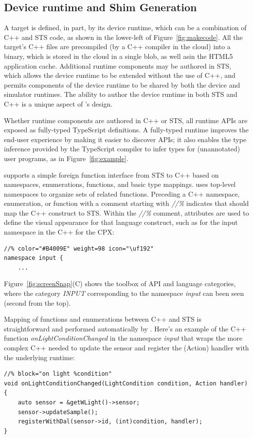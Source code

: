 \subsection{Device runtime and Shim Generation}

A \MC target is defined, in part, by its device runtime, which can be a combination of C++
and STS code, as shown in the lower-left of Figure~\ref{fig:makecode}.
All the target's C++ files are precompiled (by a C++ compiler in the cloud)
into a binary, which is stored in the cloud in a single blob, as well asin the HTML5 application cache. Additional runtime
components may be authored in STS, which allows the device runtime to be extended without the
use of C++, and permits components of the device runtime to be shared by both the device
and simulator runtimes. The ability to author the device runtime in both STS and C++ is
a unique aspect of \MCN's design.

Whether runtime components are authored in C++ or STS, all runtime APIs are exposed as fully-typed
TypeScript definitions. A fully-typed runtime improves the end-user experience
by making it easier to discover APIs; it also enables the type inference provided by the TypeScript
compiler to infer types for (unannotated) user programs, as in Figure~\ref{fig:example}.

\MC supports a simple foreign function interface from STS to C++ based on namespaces,
enumerations, functions, and basic type mappings. \MC uses top-level namespaces to organize sets of related functions.  Preceding a C++ namespace, enumeration, or function
with a comment starting with \emph{//\%} indicates that \MC should map the C++ construct to STS.
Within the \emph{//\%} comment, attributes are used to define the visual appearance for that
language construct, such as for the input namespace in the C++ for the CPX:
\begin{lstlisting}
//% color="#B4009E" weight=98 icon="\uf192"
namespace input {
    ...
\end{lstlisting}

Figure~\ref{fig:screenSnap}(C) shows the toolbox of API and language categories, where the
category \emph{INPUT} corresponding to the namespace \emph{input} can been seen (second
from the top).

Mapping of functions and enumerations between C++ and STS is straightforward
and performed automatically by \MC.
Here's an example of the C++ function \emph{onLightConditionChanged}
in the namespace \emph{input} that
wraps the more complex C++ needed to update the sensor and register the (Action)
handler with the underlying \CO runtime:
\begin{lstlisting}
//% block="on light %condition"
void onLightConditionChanged(LightCondition condition, Action handler) {
    auto sensor = &getWLight()->sensor;
    sensor->updateSample();
    registerWithDal(sensor->id, (int)condition, handler);
}
\end{lstlisting}

